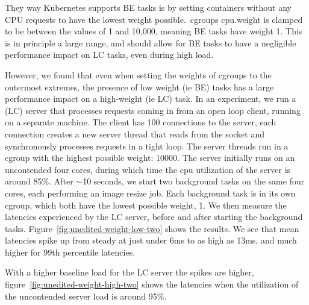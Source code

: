 They way Kubernetes supports BE tasks is by setting containers without any CPU
requests to have the lowest weight possible.\ cgroups cpu.weight is clamped to
be between the values of 1 and 10,000, meaning BE tasks have weight 1. This is
in principle a large range, and should allow for BE tasks to have a negligible
performance impact on LC tasks, even during high load. 

However, we found that even when setting the weights of cgroups to the outermost
extremes, the presence of low weight (ie BE) tasks has a large performance
impact on a high-weight (ie LC) task. In an experiment, we run a (LC) server
that processes requests coming in from an open loop client, running on a
separate machine. The client has 100  connections to
the server, each connection creates a new server thread that reads from the
socket and synchronously processes requests in a tight loop. The server threads
run in a cgroup with the highest possible weight: 10000. The server initially
runs on an uncontended four cores, during which time the cpu utilization of the
server is around 85\%. After $\sim$10 seconds, we start two background tasks on
the same four cores, each performing an image resize job. Each background task
is in its own cgroup, which both have the lowest possible weight, 1. We then
measure the latencies experienced by the LC server, before and after starting
the background tasks. Figure~\ref{fig:unedited-weight-low-two} shows the
results. We see that mean latencies spike up from steady at just under 6ms to as
high as 13ms, and much higher for 99th percentile latencies.

With a higher baseline load for the LC server the spikes are higher,
figure~\ref{fig:unedited-weight-high-two} shows the latencies when the
utilization of the uncontended server load is around 95\%.







